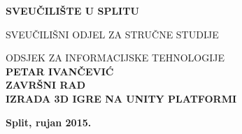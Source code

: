 \begin{center}
\thispagestyle{empty}

\begingroup
    \fontsize{14pt}{12pt}\selectfont\bfseries\center
 	SVEUČILIŠTE U SPLITU \par
	SVEUČILIŠNI ODJEL ZA STRUČNE STUDIJE \par
	ODSJEK ZA INFORMACIJSKE TEHNOLOGIJE
\endgroup\\[4cm]

{ \fontsize{18pt}{12pt}\selectfont\bfseries PETAR IVANČEVIĆ}\\[1cm]



{ \fontsize{14pt}{12pt}\selectfont\bfseries ZAVRŠNI RAD}\\[1cm]

{ \fontsize{18pt}{12pt}\bfseries IZRADA 3D IGRE NA UNITY PLATFORMI}

\vfill
{ \fontsize{14pt}{12pt}\selectfont\bfseries Split, rujan 2015.}

\end{center}